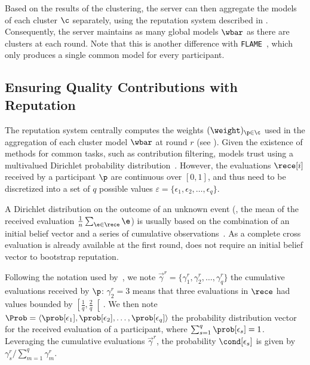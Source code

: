 Based on the results of the clustering, the server can then aggregate the models of each cluster $\c$ separately, using the reputation system described in .
Consequently, the server maintains as many global models $\wbar$ as there are clusters at each round. 
Note that this is another difference with \texttt{FLAME}~\cite{nguyen_FLAMETamingBackdoors_2022}, which only produces a single common model for every participant. 


\subsection{Ensuring Quality Contributions with Reputation\label{sec:radar.archi.reput}}

The reputation system centrally computes the weights $(\weight)_{\p \in \c}$ used in the aggregation of each cluster model $\wbar$ at round $r$ (see ).
Given the existence of methods for common tasks, such as contribution filtering, \thecontrib models trust using a multivalued Dirichlet probability distribution~\cite{fung_DirichletBasedTrustManagement_2011}. 
However, the evaluations $\rece[i]$ received by a participant $\p$ are continuous over $[0,1]$, and thus need to be discretized into a set of $q$ possible values $\varepsilon = \{\epsilon_1, \epsilon_2, \ldots, \epsilon_q\}$. 

A Dirichlet distribution on the outcome of an unknown event (\ie, the mean of the received evaluation $\frac{1}{n}\sum_{\e \in \rece} \e$) is usually based on the combination of an initial belief vector and a series of cumulative observations~\cite{fung_DirichletBasedTrustManagement_2011}. 
As a complete cross evaluation is already available at the first round, \thecontrib does not require an initial belief vector to bootstrap reputation.

Following the notation used by~\textcite{fung_DirichletBasedTrustManagement_2011}, we note $\vec{\gamma}^r = \{\gamma_{1}^r,\gamma_{2}^r,\ldots,\gamma_{q}^r\}$ the cumulative evaluations received by $\p$: $\gamma_{2}^r=3$ means that three evaluations in $\rece$ had values bounded by $\left[\frac{1}{q},\frac{2}{q}\right[$.
We then note $\Prob = {\langle\prob[\epsilon_1],\prob[\epsilon_2], \ldots, \prob[\epsilon_q]\rangle}$ the probability distribution vector for the received evaluation of a participant, where $\sum_{s=1}^{q}\prob[\epsilon_s] = 1$.
Leveraging the cumulative evaluations $\vec{\gamma}^r$, the probability $\cond[\epsilon_s]$ is given by $\gamma_{s}^r / \sum_{m=1}^{q}{\gamma_{m}^r}$.

